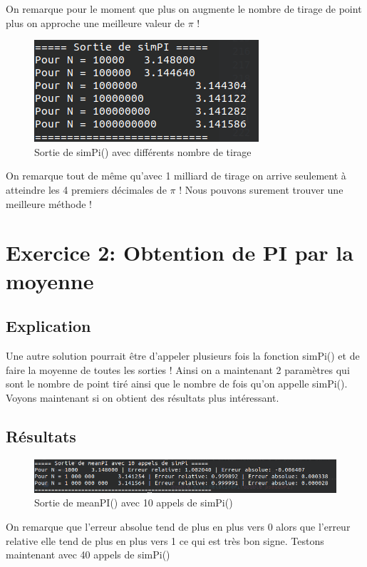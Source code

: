 \documentclass[12pt,french]{article} %
\begin{document}
On remarque pour le moment que plus on augmente le nombre de tirage de point plus on approche une meilleure valeur de $\pi$ ! 

\begin{figure}[H]
	\centering
	\includegraphics[scale=0.7]{exo1-1.png}
	\caption{Sortie de simPi() avec différents nombre de tirage}
\end{figure}

On remarque tout de même qu'avec 1 milliard de tirage on arrive seulement à atteindre les 4 premiers décimales de $\pi$ ! Nous pouvons surement trouver une meilleure méthode !

\section{Exercice 2: Obtention de PI par la moyenne}

\subsection{Explication}

Une autre solution pourrait être d'appeler plusieurs fois la fonction simPi() et de faire la moyenne de toutes les sorties !
Ainsi on a maintenant 2 paramètres qui sont le nombre de point tiré ainsi que le nombre de fois qu'on appelle simPi().
Voyons maintenant si on obtient des résultats plus intéressant.

\subsection{Résultats}

\begin{figure}[H]
	\centering
	\includegraphics[scale=0.6]{exo2-1.png}
	\caption{Sortie de meanPI() avec 10 appels de simPi()}
\end{figure}


On remarque que l'erreur absolue tend de plus en plus vers 0 alors que l'erreur relative elle tend de plus en plus vers 1 ce qui est très bon signe.
Testons maintenant avec 40 appels de simPi()
\end{document}
